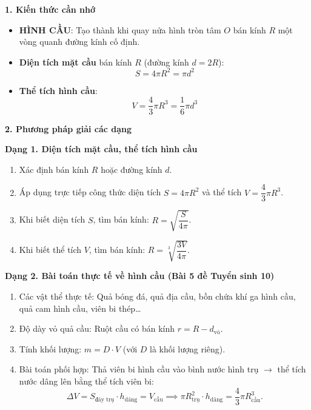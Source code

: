 \textbf{1. Kiến thức cần nhớ}
\begin{itemize}
\item \textbf{HÌNH CẦU}: Tạo thành khi quay nửa hình tròn tâm $O$ bán kính $R$ một vòng quanh đường kính cố định.
\item \textbf{Diện tích mặt cầu} bán kính $R$ (đường kính $d = 2R$):
$$\boxed{S = 4\pi R^2 = \pi d^2}$$
\item \textbf{Thể tích hình cầu}:
$$\boxed{V = \dfrac{4}{3}\pi R^3 = \dfrac{1}{6}\pi d^3}$$
\end{itemize}

\textbf{2. Phương pháp giải các dạng}

\textbf{Dạng 1. Diện tích mặt cầu, thể tích hình cầu}
\begin{enumerate}
\item Xác định bán kính $R$ hoặc đường kính $d$.
\item Áp dụng trực tiếp công thức diện tích $S = 4\pi R^2$ và thể tích $V = \dfrac{4}{3}\pi R^3$.
\item Khi biết diện tích $S$, tìm bán kính: $\boxed{R = \sqrt{\dfrac{S}{4\pi}}}$.
\item Khi biết thể tích $V$, tìm bán kính: $\boxed{R = \sqrt[3]{\dfrac{3V}{4\pi}}}$.
\end{enumerate}

\textbf{Dạng 2. Bài toán thực tế về hình cầu (Bài 5 đề Tuyển sinh 10)}
\begin{enumerate}
\item Các vật thể thực tế: Quả bóng đá, quả địa cầu, bồn chứa khí ga hình cầu, quả cam hình cầu, viên bi thép\dots
\item Độ dày vỏ quả cầu: Ruột cầu có bán kính $r = R - d_{\text{vỏ}}$.
\item Tính khối lượng: $m = D \cdot V$ (với $D$ là khối lượng riêng).
\item Bài toán phối hợp: Thả viên bi hình cầu vào bình nước hình trụ $\rightarrow$ thể tích nước dâng lên bằng thể tích viên bi:
$$\Delta V = S_{\text{đáy trụ}} \cdot h_{\text{dâng}} = V_{\text{cầu}} \implies \pi R_{\text{trụ}}^2 \cdot h_{\text{dâng}} = \dfrac{4}{3}\pi R_{\text{cầu}}^3.$$
\end{enumerate}
